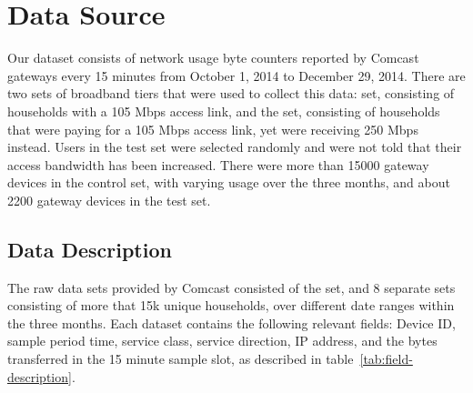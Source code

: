 \section{Data Source}
\label{sec:data}
Our dataset consists of network usage byte counters reported by Comcast gateways every 15 minutes from October 1, 2014 to December 29, 2014. There are two sets of broadband tiers that were used to collect this data: \control set, consisting of households with a 105 Mbps access link, and the \test set, consisting of households that were paying for a 105 Mbps access link, yet were receiving 250 Mbps instead. Users in the test set were selected randomly and were not told that their access bandwidth has been increased. There were more than 15000 gateway devices in the control set, with varying usage over the three months, and about 2200 gateway devices in the test set.


\subsection{Data Description}

The raw data sets provided by Comcast consisted of the \test set, and 8 separate \control sets consisting of more that 15k unique households, over different date ranges within the three months. Each dataset contains the following relevant fields: Device ID, sample period time, service class, service direction, IP address, and the bytes transferred in the 15 minute sample slot, as described in table~\ref{tab:field-description}.


